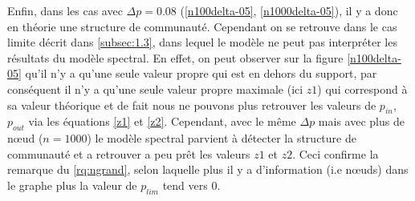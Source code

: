 Enfin, dans les cas avec $\Delta p = 0.08$ (\ref{n100delta-05}, \ref{n1000delta-05}), il y a donc en théorie une structure de communauté. 
Cependant on se retrouve dans le cas limite décrit dans \autoref{subsec:1.3}, dans lequel le modèle ne peut pas interpréter les résultats du modèle spectral.
En effet, on peut observer sur la figure \ref{n100delta-05} qu'il n'y a qu'une seule valeur propre qui est en dehors du support, par conséquent il n'y a qu'une seule valeur propre maximale (ici $z1$) qui correspond à sa valeur théorique et de fait nous ne pouvons plus retrouver les valeurs de $p_{in}$, $p_{out}$ via les équations \eqref{z1} et \eqref{z2}.
Cependant, avec le même $\Delta p$ mais avec plus de nœud ($n = 1000$) le modèle spectral parvient à détecter la structure de communauté et a retrouver a peu prêt les valeurs $z1$ et $z2$.  
Ceci confirme la remarque du \autoref{rq:ngrand}, selon laquelle plus il y a d’information (i.e nœuds) dans le graphe plus la valeur de $p_{lim}$ tend vers $0$.
